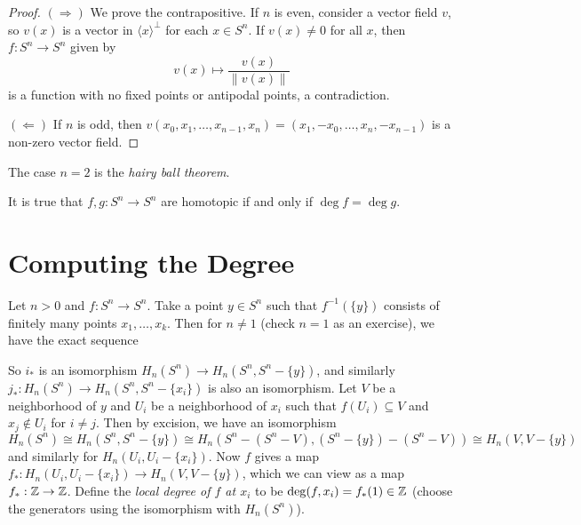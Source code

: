 \begin{proof}
  $(\Rightarrow)$ We prove the contrapositive.
  If $n$ is even,
  consider a vector field $v$, so $v(x)$ is a
  vector in $\langle x \rangle^\perp$ for each
  $x \in S^n$. If $v(x) \ne 0$ for all $x$, then
  $f : S^n \to S^n$ given by
  \[
    v(x) \mapsto \frac{v(x)}{\|v(x)\|}
  \]
  is a function with no fixed points or
  antipodal points, a contradiction.

  $(\Leftarrow)$ If $n$ is odd, then
  $v(x_0, x_1, \dots, x_{n - 1}, x_n) = (x_1, -x_0, \dots, x_n, -x_{n - 1})$ is a non-zero vector field.
\end{proof}

\begin{remark}
  The case $n = 2$ is the \emph{hairy ball theorem}.
\end{remark}

\begin{remark}
  It is true that $f, g : S^n \to S^n$ are homotopic
  if and only if $\deg f = \deg g$.
\end{remark}

\section{Computing the Degree}

\begin{definition}
  Let $n > 0$ and $f : S^n \to S^n$.
  Take a point $y \in S^n$ such
  that $f^{-1}(\{y\})$ consists of finitely many
  points $x_1, \dots, x_k$. Then for $n \ne 1$ (check
  $n = 1$ as an exercise), we
  have the exact sequence
  \begin{center}
  \end{center}
  So $i_*$ is an isomorphism $H_n(S^n) \to H_n(S^n, S^n - \{y\})$, and similarly
  $j_* : H_n(S^n) \to H_n(S^n, S^n - \{x_i\})$
  is also an isomorphism. Let $V$ be a neighborhood
  of $y$ and $U_i$ be a neighborhood of $x_i$ such
  that $f(U_i) \subseteq V$ and $x_j \notin U_i$
  for $i \ne j$. Then by excision, we have an
  isomorphism
  \[
    H_n(S^n)
    \cong H_n(S^n, S^n - \{y\})
    \cong H_n(S^n - (S^n - V), (S^n - \{y\}) - (S^n - V))
    \cong H_n(V, V - \{y\})
  \]
  and similarly for $H_n(U_i, U_i - \{x_i\})$. Now
  $f$ gives a map $f_* : H_n(U_i, U_i - \{x_i\}) \to H_n(V, V - \{y\})$, which we can view
  as a map $f_* : \mathbb{Z} \to \mathbb{Z}$. Define the
  \emph{local degree of $f$ at $x_i$} to be
  $\deg (f, x_i) = f_*(1) \in \mathbb{Z}$ (choose the generators
  using the isomorphism with $H_n(S^n)$).
\end{definition}

